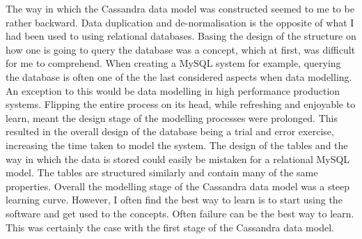 The way in which the Cassandra data model was constructed seemed to me to be rather backward. Data duplication and de-normalisation is the opposite of what I had been used to using relational databases. Basing the design of the structure on how one is going to query the database was a concept, which at first, was difficult for me to comprehend. When creating a MySQL system for example, querying the database is often one of the the last considered aspects when data modelling. An exception to this would be data modelling in high performance production systems. Flipping the entire process on its head, while refreshing and enjoyable to learn, meant the design stage of the modelling processes were prolonged. This resulted in the overall design of the database being a trial and error exercise, increasing the time taken to model the system. The design of the tables and the way in which the data is stored could easily be mistaken for a relational MySQL model. The tables are structured similarly and contain many of the same properties. Overall the modelling stage of the Cassandra data model was a steep learning curve. However, I often find the best way to learn is to start using the software and get used to the concepts. Often failure can be the best way to learn. This was certainly the case with the first stage of the Cassandra data model.